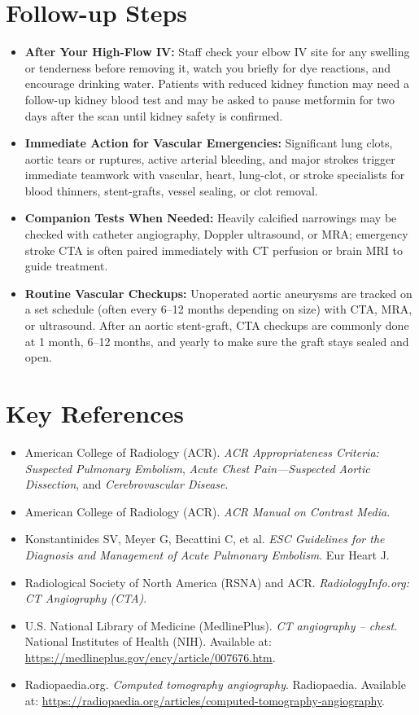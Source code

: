 \section{Follow-up Steps}
\begin{itemize}
    \item \textbf{After Your High-Flow IV:} Staff check your elbow IV site for any swelling or tenderness before removing it, watch you briefly for dye reactions, and encourage drinking water. Patients with reduced kidney function may need a follow-up kidney blood test and may be asked to pause metformin for two days after the scan until kidney safety is confirmed.
    \item \textbf{Immediate Action for Vascular Emergencies:} Significant lung clots, aortic tears or ruptures, active arterial bleeding, and major strokes trigger immediate teamwork with vascular, heart, lung-clot, or stroke specialists for blood thinners, stent-grafts, vessel sealing, or clot removal.
    \item \textbf{Companion Tests When Needed:} Heavily calcified narrowings may be checked with catheter angiography, Doppler ultrasound, or MRA; emergency stroke CTA is often paired immediately with CT perfusion or brain MRI to guide treatment.
    \item \textbf{Routine Vascular Checkups:} Unoperated aortic aneurysms are tracked on a set schedule (often every 6--12 months depending on size) with CTA, MRA, or ultrasound. After an aortic stent-graft, CTA checkups are commonly done at 1 month, 6--12 months, and yearly to make sure the graft stays sealed and open.
\end{itemize}

\section{Key References}
\begin{itemize}
    \item American College of Radiology (ACR). \textit{ACR Appropriateness Criteria: Suspected Pulmonary Embolism}, \textit{Acute Chest Pain---Suspected Aortic Dissection}, and \textit{Cerebrovascular Disease}.
    \item American College of Radiology (ACR). \textit{ACR Manual on Contrast Media}.
    \item Konstantinides SV, Meyer G, Becattini C, et al. \textit{ESC Guidelines for the Diagnosis and Management of Acute Pulmonary Embolism}. Eur Heart J.
    \item Radiological Society of North America (RSNA) and ACR. \textit{RadiologyInfo.org: CT Angiography (CTA)}.
    \item U.S. National Library of Medicine (MedlinePlus). \textit{CT angiography -- chest}. National Institutes of Health (NIH). Available at: \url{https://medlineplus.gov/ency/article/007676.htm}.
    \item Radiopaedia.org. \textit{Computed tomography angiography}. Radiopaedia. Available at: \url{https://radiopaedia.org/articles/computed-tomography-angiography}.
\end{itemize}

